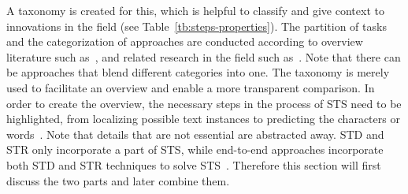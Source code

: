 A taxonomy is created for this, which is helpful to classify and give context to innovations in the
field (see Table~\ref{tb:steps-properties}).
The partition of tasks and the categorization of approaches are conducted according to overview
literature such as~\cite{long_scene_2021,chen_text_2021,cong_comparative_2019}, and related research
in the field such
as~\cite{qiao_text_2021,sheng_centripetaltext_2021,liu_accurate_2020,deng_pixellink_2018}.
Note that there can be approaches that blend different categories into one.
The taxonomy is merely used to facilitate an overview and enable a more transparent comparison.
In order to create the overview, the necessary steps in the process of \ac{STS} need to be
highlighted, from localizing possible text instances to predicting the characters or
words~\citep{long_scene_2021, sourvanos_challenges_2018}.
Note that details that are not essential are abstracted away.
\ac{STD} and \ac{STR} only incorporate a part of \ac{STS}, while end-to-end approaches
incorporate both \ac{STD} and \ac{STR} techniques to solve
\ac{STS}~\citep{long_scene_2021,ghosh_visual_2017,chen_text_2021}.
Therefore this section will first discuss the two parts and later combine them.

